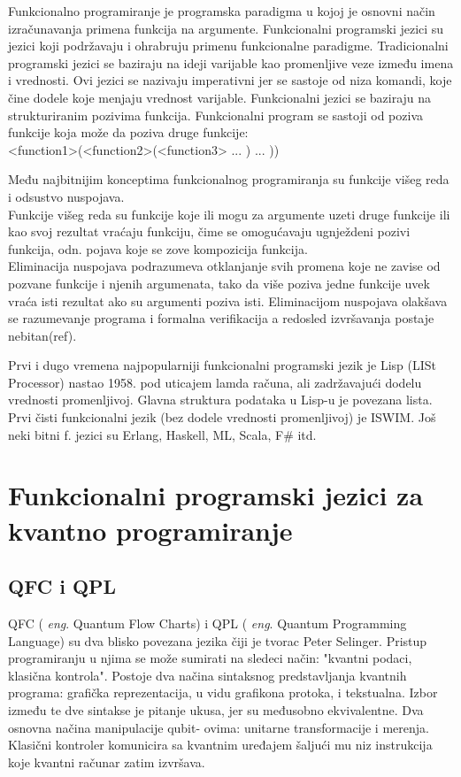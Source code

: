 \documentclass[a4paper]{article}
\begin{document}
{Funkcionalno programiranje je programska paradigma u kojoj je osnovni način izračunavanja primena funkcija na argumente.
Funkcionalni programski jezici su jezici koji podržavaju i ohrabruju primenu funkcionalne paradigme.
Tradicionalni programski jezici se baziraju na ideji varijable kao promenljive veze između imena i vrednosti. Ovi jezici se nazivaju 
imperativni jer se sastoje od niza komandi, koje čine dodele koje menjaju vrednost varijable.
Funkcionalni jezici se baziraju na strukturiranim pozivima funkcija. Funkcionalni program se sastoji od poziva funkcije koja može da
poziva druge funkcije:\\
<function1>(<function2>(<function3> ... ) ... ))

Među najbitnijim konceptima funkcionalnog programiranja su funkcije višeg reda i odsustvo nuspojava. \\
Funkcije višeg reda su funkcije koje ili mogu za argumente uzeti druge funkcije ili kao svoj rezultat vraćaju funkciju, čime se omogućavaju ugnježdeni pozivi funkcija, odn. pojava koje se zove kompozicija funkcija.\\
Eliminacija nuspojava podrazumeva otklanjanje svih promena koje ne zavise od pozvane funkcije i njenih argumenata, tako da više poziva jedne funkcije uvek vraća isti rezultat ako su argumenti poziva isti. Eliminacijom nuspojava olakšava se razumevanje programa i formalna 
verifikacija a redosled izvršavanja postaje nebitan(ref).\par
Prvi i dugo vremena najpopularniji funkcionalni programski jezik je Lisp (LISt Processor) nastao 1958. pod uticajem lamda računa, ali 
zadržavajući dodelu vrednosti promenljivoj. Glavna struktura podataka u Lisp-u je povezana lista. Prvi čisti funkcionalni jezik 
(bez dodele vrednosti promenljivoj) je ISWIM. Još neki bitni f. jezici su Erlang, Haskell, ML, Scala, F\# itd.

\section{Funkcionalni programski jezici za kvantno programiranje}
\label{sec:funcprl_qp}

\subsection{QFC i QPL}\cite{qfc}
\label{sec:qfc_qml}

QFC ( \emph{eng}. Quantum Flow Charts) i QPL ( \emph{eng}. Quantum Programming Language) su dva blisko povezana jezika čiji je tvorac Peter Selinger.  Pristup programiranju u njima se može sumirati na sledeci način: "kvantni podaci, klasična kontrola". Postoje dva načina sintaksnog predstavljanja kvantnih programa: grafička reprezentacija, u vidu grafikona protoka, i tekstualna. Izbor između te dve sintakse je pitanje ukusa, jer su međusobno ekvivalentne. Dva osnovna načina manipulacije qubit- ovima: unitarne transformacije i merenja. Klasični kontroler komunicira sa kvantnim uređajem šaljući mu niz instrukcija koje kvantni računar zatim izvršava. 

}
\end{document}
